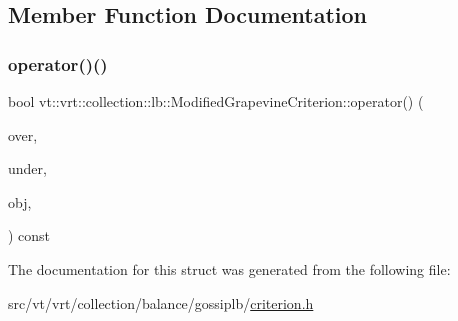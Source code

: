 \subsection{Member Function Documentation}
\mbox{\label{structvt_1_1vrt_1_1collection_1_1lb_1_1_modified_grapevine_criterion_a6331ccac176ead3e10e58809f3e02ef8}} 
\subsubsection{\texorpdfstring{operator()()}{operator()()}}
{\footnotesize\ttfamily bool vt\+::vrt\+::collection\+::lb\+::\+Modified\+Grapevine\+Criterion\+::operator() (\begin{DoxyParamCaption}\item[{\hyperlink{structvt_1_1vrt_1_1collection_1_1lb_1_1_criterion_base_a78e6b14fc6f7b34acac1d7cd4e850180}{Load\+Type}}]{over,  }\item[{\hyperlink{structvt_1_1vrt_1_1collection_1_1lb_1_1_criterion_base_a78e6b14fc6f7b34acac1d7cd4e850180}{Load\+Type}}]{under,  }\item[{\hyperlink{structvt_1_1vrt_1_1collection_1_1lb_1_1_criterion_base_a78e6b14fc6f7b34acac1d7cd4e850180}{Load\+Type}}]{obj,  }\item[{\hyperlink{structvt_1_1vrt_1_1collection_1_1lb_1_1_criterion_base_a78e6b14fc6f7b34acac1d7cd4e850180}{Load\+Type}}]{ }\end{DoxyParamCaption}) const\hspace{0.3cm}{\ttfamily [inline]}}



The documentation for this struct was generated from the following file\+:\begin{DoxyCompactItemize}
\item 
src/vt/vrt/collection/balance/gossiplb/\hyperlink{criterion_8h}{criterion.\+h}\end{DoxyCompactItemize}
